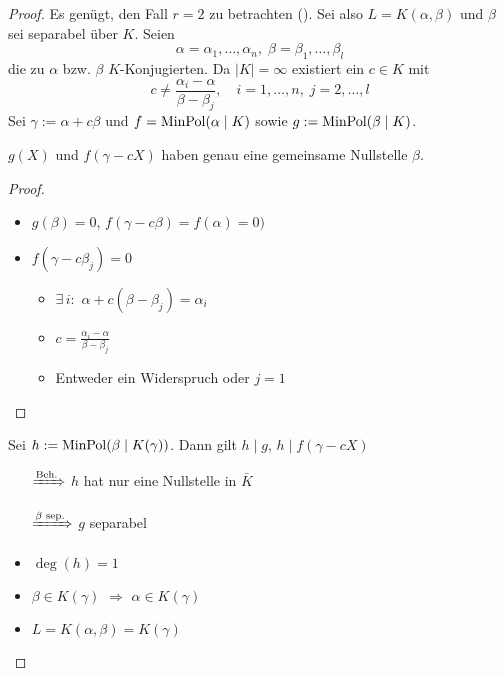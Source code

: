 \begin{proof}
	Es genügt, den Fall $r = 2$ zu betrachten (). Sei also $L = K(\alpha,\beta)$ und $\beta$ sei separabel über $K$. Seien \begin{equation*}
		\alpha = \alpha_1,\dots,\alpha_n,\;\beta = \beta_1,\dots,\beta_l
	\end{equation*}
	die zu $\alpha$ bzw. $\beta$ $K$-Konjugierten. Da $\vert K \vert = \infty$ existiert ein $c\in K$ mit \begin{equation*}
		c \neq \frac{\alpha_i - \alpha}{\beta-\beta_j},\quad i=1,\dots,n,\;j=2,\dots,l
	\end{equation*}
	Sei $\gamma := \alpha + c\beta$ und $f = \operatorname{MinPol}(\alpha\mid K)$ sowie $g := \operatorname{MinPol}(\beta\mid K)$.
	\begin{underlinedenvironment}[Behauptung]
		$g(X)$ und $f(\gamma- cX)$ haben genau eine gemeinsame Nullstelle $\beta$.
	\end{underlinedenvironment}
	\vspace*{\dimexpr-\baselineskip-2\lineskip}
	\begin{proof}\leavevmode
		\begin{itemize}[topsep=\dimexpr-6pt-\lineskip\relax]
			\item $g(\beta) = 0$, $f(\gamma - c\beta) = f(\alpha) = 0)$
			\item $f(\gamma - c\beta_j) = 0$ \begin{itemize}[topsep=-6pt,label={$\Rightarrow$}]
				\item $\exists\,i\colon$ $\alpha + c(\beta - \beta_j) = \alpha_i$
				\item $\displaystyle c = \frac{\alpha_i - \alpha}{\beta - \beta_j}$
				\item Entweder ein Widerspruch oder $j=1$
			\end{itemize}
		\end{itemize}
	\end{proof}
	Sei $h := \operatorname{MinPol}(\beta\mid K(\gamma))$. Dann gilt $h\mid g$, $h\mid f(\gamma -cX)$ \begin{itemize}[topsep=-6pt,label={$\Rightarrow$},widest={$\xRightarrow{\text{$\beta$ sep.}}$},leftmargin=*]
		\item[$\xRightarrow{\text{Beh.}}$] $h$ hat nur eine Nullstelle in $\bar K$
		\item[$\xRightarrow{\text{$\beta$ sep.}}$] $g$ separabel
		\item $\deg(h) = 1$
		\item $\beta\in K(\gamma)$ $\Rightarrow$ $\alpha\in K(\gamma)$
		\item $L = K(\alpha,\beta) = K(\gamma)$
	\end{itemize}
\end{proof}
